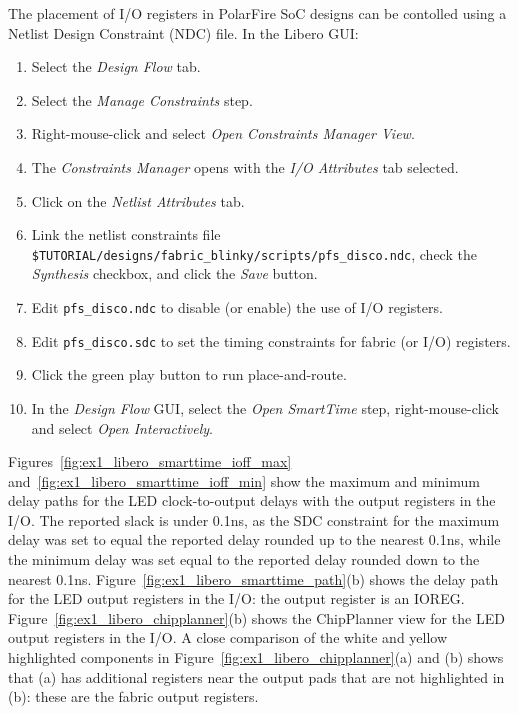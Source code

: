 The placement of I/O registers in PolarFire SoC designs can be
contolled using a Netlist Design Constraint (NDC) file. In the Libero GUI:
%
\begin{enumerate}
\item Select the \emph{Design Flow} tab.
\item Select the \emph{Manage Constraints} step.
\item Right-mouse-click and select \emph{Open Constraints Manager View}.
\item The \emph{Constraints Manager} opens with the \emph{I/O Attributes}
tab selected.
\item Click on the \emph{Netlist Attributes} tab.
\item Link the netlist constraints file\newline
\verb+$TUTORIAL/designs/fabric_blinky/scripts/pfs_disco.ndc+,\newline %
check the \emph{Synthesis} checkbox,
and click the \emph{Save} button.
\item Edit \verb+pfs_disco.ndc+ to disable (or enable) the use of I/O registers.
\item Edit \verb+pfs_disco.sdc+ to set the timing constraints for fabric (or I/O) registers.

\item Click the green play button to run place-and-route.

\item In the \emph{Design Flow} GUI, select the \emph{Open SmartTime} step,
right-mouse-click and select \emph{Open Interactively}.
\end{enumerate}
%
Figures~\ref{fig:ex1_libero_smarttime_ioff_max}
and~\ref{fig:ex1_libero_smarttime_ioff_min} show the maximum and
minimum delay paths for the LED clock-to-output delays with the output
registers in the I/O.
The reported slack is under 0.1ns, as the SDC constraint for the maximum delay
was set to equal the reported delay rounded up to the nearest 0.1ns,
while the minimum delay was set equal to the reported delay rounded down
to the nearest 0.1ns.
%
Figure~\ref{fig:ex1_libero_smarttime_path}(b) shows the delay
path for the LED output registers in the I/O: the output register
is an IOREG.
%
Figure~\ref{fig:ex1_libero_chipplanner}(b) shows the ChipPlanner
view for the LED output registers in the I/O.
A close comparison of the white and yellow highlighted components in
Figure~\ref{fig:ex1_libero_chipplanner}(a) and (b) shows
that (a) has additional registers near the output pads that are not
highlighted in (b): these are the fabric output registers.

